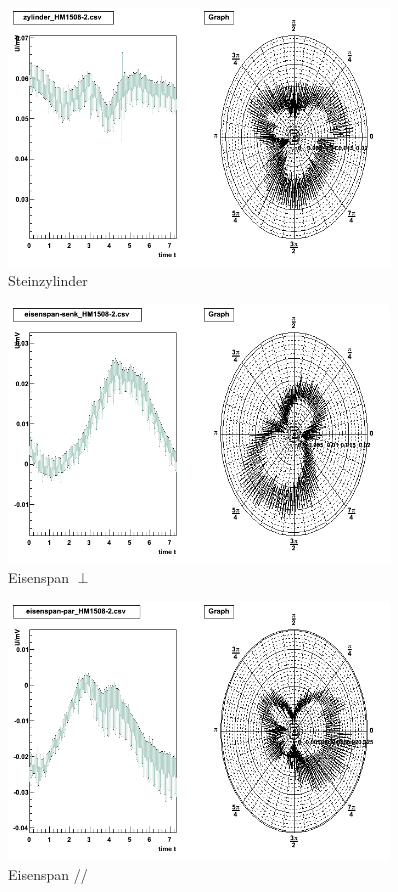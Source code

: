 \begin{appendix}
\begin{figure}[H]
	\centering \includegraphics[width=0.9\textwidth]{Auswertung/Proben-polar/zylinder.png}
	\caption{Steinzylinder}
\end{figure}

\begin{figure}[H]
	\centering \includegraphics[width=0.9\textwidth]{Auswertung/Proben-polar/eisenspan-senk.png}
	\caption{Eisenspan $\perp$}
\end{figure}

\begin{figure}[H]
	\centering \includegraphics[width=0.9\textwidth]{Auswertung/Proben-polar/eisenspan-par.png}
	\caption{Eisenspan //}
\end{figure}


\end{appendix}
